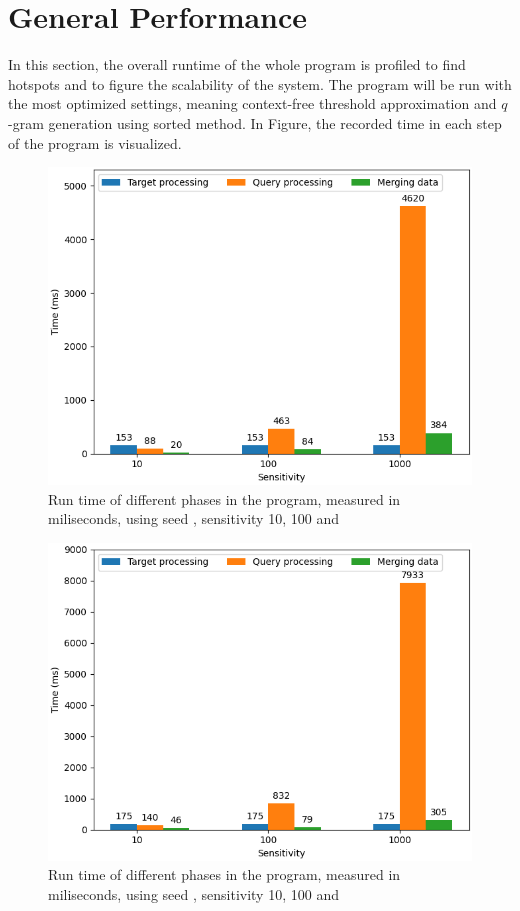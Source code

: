 \documentclass[twoside,a4paper,bsc]{master}
\newcommand{\Qgram}[1]{\(#1\)-gram}
\begin{document}
\section{General Performance}
In this section, the overall runtime of the whole program is profiled to
find hotspots and to figure the scalability of the system. The program will
be run with the most optimized settings, meaning context-free threshold
approximation and \Qgram{q} generation using sorted method. In Figure, the
recorded time in each step of the program is visualized.
\begin{figure}
\centering
\includegraphics[scale=0.6]{graphics/program_w6.png}
\caption{Run time of different phases in the program, measured in
miliseconds,
using seed , sensitivity 10, 100 and }
\label{fig:program_w6}
\end{figure}
\begin{figure}
\centering
\includegraphics[scale=0.6]{graphics/program_w7.png}
\caption{Run time of different phases in the program, measured in
miliseconds,
using seed , sensitivity 10, 100 and }
\label{fig:program_w7}
\end{figure}
\end{document}
